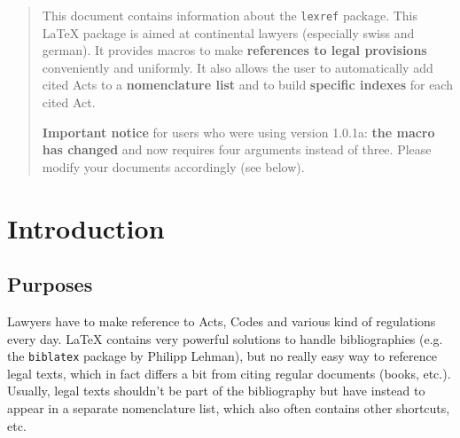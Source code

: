 \documentclass[a4paper]{ltxdockit}[2011/03/25]
\newcommand{\lexref}{\texttt{lexref}\xspace}
\begin{document}

\printtitlepage

\begin{quote}
This document contains information about the \lexref package. This \LaTeX{} package is aimed at continental lawyers (especially swiss and german). It provides macros to make \textbf{references to legal provisions} conveniently and uniformly. It also allows the user to automatically add cited Acts to a \textbf{nomenclature list} and to build \textbf{specific indexes} for each cited Act.

\textbf{Important notice} for users who were using version 1.0.1a: \textbf{the  macro has changed} and now requires four arguments instead of three. Please modify your \tex documents accordingly (see below).
\end{quote} 

\tableofcontents

\section{Introduction}

\subsection{Purposes}

Lawyers have to make reference to Acts, Codes and various kind of regulations every day. \LaTeX{} contains very powerful solutions to handle bibliographies (e.g. the \texttt{biblatex} package by Philipp Lehman), but no really easy way to reference legal texts, which in fact differs a bit from citing regular documents (books, etc.). Usually, legal texts shouldn't be part of the bibliography but have instead to appear in a separate nomenclature list, which also often contains other shortcuts, etc.
\end{document}

